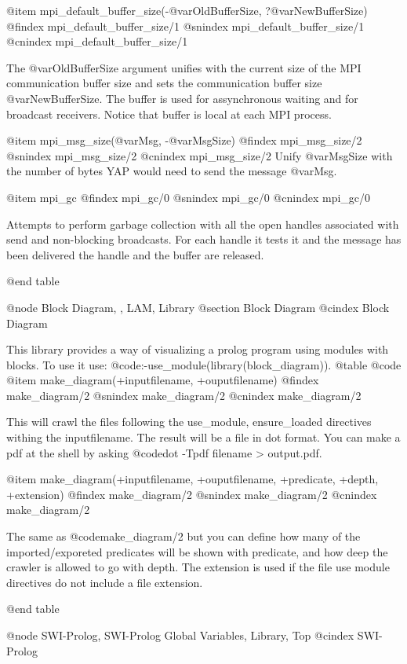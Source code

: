 {{{{{{{{@item mpi_default_buffer_size(-@var{OldBufferSize}, ?@var{NewBufferSize})
@findex mpi_default_buffer_size/1
@snindex mpi_default_buffer_size/1
@cnindex mpi_default_buffer_size/1

The @var{OldBufferSize} argument unifies with the current size of the
MPI communication buffer size and sets the communication buffer size
@var{NewBufferSize}. The buffer is used for assynchronous waiting and
for broadcast receivers. Notice that buffer is local at each MPI
process.


@item mpi_msg_size(@var{Msg}, -@var{MsgSize})
@findex mpi_msg_size/2
@snindex mpi_msg_size/2
@cnindex mpi_msg_size/2
Unify @var{MsgSize} with the number of bytes YAP would need to send the
message @var{Msg}.

@item mpi_gc
@findex mpi_gc/0
@snindex mpi_gc/0
@cnindex mpi_gc/0

Attempts to perform garbage collection with all the open handles
associated with send and non-blocking broadcasts. For each handle it
tests it and the message has been delivered the handle and the buffer
are released.

@end table

@node Block Diagram, , LAM, Library
@section Block Diagram
@cindex Block Diagram

This library provides a way of visualizing a prolog program using modules with blocks.
To use it use: @code{:-use_module(library(block_diagram))}.
@table @code
@item make_diagram(+inputfilename, +ouputfilename)
@findex make_diagram/2
@snindex make_diagram/2
@cnindex make_diagram/2

This will crawl the files following the use_module, ensure_loaded directives withing the inputfilename.
The result will be a file in dot format.
You can make a pdf at the shell by asking @code{dot -Tpdf filename > output.pdf}.

@item make_diagram(+inputfilename, +ouputfilename, +predicate, +depth, +extension)
@findex make_diagram/2
@snindex make_diagram/2
@cnindex make_diagram/2

The same as @code{make_diagram/2} but you can define how many of the imported/exporeted predicates will be shown with predicate, and how deep the crawler is allowed to go with depth. The extension is used if the file use module directives do not include a file extension.

@end table


@node SWI-Prolog, SWI-Prolog Global Variables, Library, Top
@cindex SWI-Prolog

}}}}}}}}

